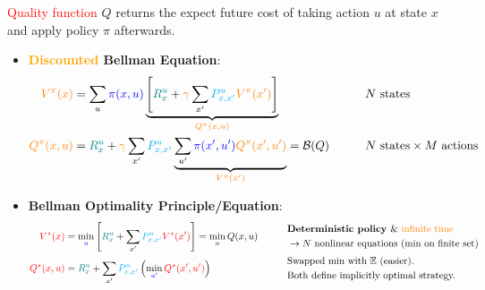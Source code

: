 \textcolor{red}{Quality function} $Q$ returns the expect future cost of taking action $u$ at state $x$ and apply policy $\pi$ afterwards.
\begin{itemize}
    \item \textbf{\textcolor{orange}{Discounted} Bellman Equation}:
    \begin{alignat*}{2}
        {\color{orange}V^{\pi}(x)} &= \sum_{u} \textcolor{blue}{\pi(x, u)} \underbrace{\left[ {\color{teal}R^u_x} + {\color{orange}\gamma} \sum_{x'} {\color{cyan}P^u_{x,x'}} {\color{orange}V^{\pi}(x')} \right]}_{{\color{orange}Q^{\pi}(x,u)}} \qquad && N \text{ states}\\
        {\color{orange}Q^{\pi}(x,u)} &= {\color{teal}R^u_x} + {\color{orange}\gamma} \sum_{x'} {\color{cyan}P^u_{x,x'}} \underbrace{\sum_{u'} \textcolor{blue}{\pi(x', u')} {\color{orange}Q^{\pi}(x', u')}}_{\color{orange}V^{\pi}(x')} = \mathcal{B}(Q) \qquad && N \text{ states} \times M \text{ actions}
    \end{alignat*}
    \item \textbf{Bellman Optimality Principle/Equation}:
    \begin{alignat*}{2}
        \textcolor{red}{V^\star(x)} &= \min_{\textcolor{blue}{u}} \left[ {\color{teal}R^u_x} + \sum_{x'} {\color{cyan}P^u_{x,x'}} \textcolor{red}{V^\star(x')} \right] = \min_u Q(x,u) \qquad &&
        \begin{aligned}
            &\textbf{Deterministic policy } \& \textcolor{orange}{\text{ infinite time}} \\
            &\rightarrow N \text{ nonlinear equations (min on finite set)}
        \end{aligned} \\
        \textcolor{red}{Q^\star(x,u)} &= {\color{teal}R^u_x} + \sum_{x'} {\color{cyan}P^u_{x,x'}} \left( \min_{\textcolor{blue}{u'}} \textcolor{red}{Q^\star(x', u')} \right) \qquad &&
        \begin{aligned}
            &\text{Swapped min with $\mathbb{E}$ (easier).}\\ 
            &\text{Both define implicitly optimal strategy.} 
        \end{aligned}
    \end{alignat*}
\end{itemize}

